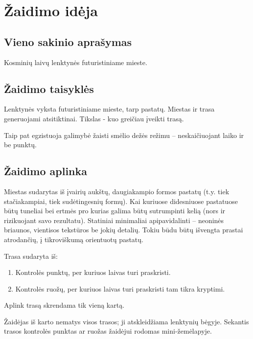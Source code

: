\section{Žaidimo idėja}
\subsection{Vieno sakinio aprašymas}

Kosminių laivų lenktynės futuristiniame mieste.

\subsection{Žaidimo taisyklės}

Lenktynės vyksta futuristiniame mieste, tarp pastatų.
Miestas ir trasa generuojami atsitiktinai.
Tikslas - kuo greičiau įveikti trasą.

Taip pat egzistuoja galimybė žaisti smėlio dežės režimu -- neskaičiuojant laiko ir be punktų.

\subsection{Žaidimo aplinka}

Miestas sudarytas iš įvairių aukštų, daugiakampio formos pastatų (t.y. tiek stačiakampiai, tiek sudėtingesnių formų).
Kai kuriuose didesniuose pastatuose būtų tuneliai bei ertmės pro kurias galima būtų sutrumpinti kelią (nors ir rizikuojant savo rezultatu).
Statiniai minimaliai apipavidalinti -- neoninės briaunos, vientisos tekstūros be jokių detalių.
Tokiu būdu būtų išvengta prastai atrodančių, į tikroviškumą orientuotų pastatų.


Trasa sudaryta iš:
\begin{enumerate}
\item Kontrolės punktų, per kuriuos laivas turi praskristi.
\item Kontrolės ruožų, per kuriuos laivas turi praskristi tam tikra kryptimi.
\end{enumerate}
Aplink trasą skrendama tik vieną kartą.

Žaidėjas iš karto nematys visos trasos; ji atskleidžiama lenktynių bėgyje.
Sekantis trasos kontrolės punktas ar ruožas žaidėjui rodomas mini-žemėlapyje.

